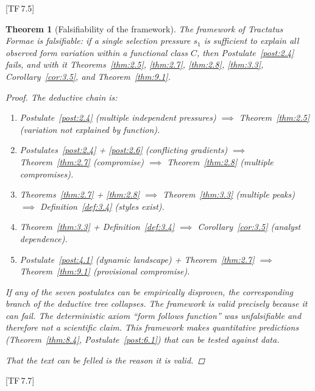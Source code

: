 \documentclass[10pt]{article}
\theoremstyle{definition}
\theoremstyle{plain}
\newtheorem{theorem}[definition]{Theorem}
\theoremstyle{remark}
\newcommand{\TF}[1]{\textnormal{[TF\,#1]}}  %
\begin{document}
\TF{7.5}

\begin{theorem}[Falsifiability of the framework]\label{thm:9.3}
The framework of Tractatus Formae is falsifiable: if a single selection
pressure $s_1$ is sufficient to explain all observed form variation
within a functional class $C$, then Postulate~\ref{post:2.4} fails, and
with it Theorems~\ref{thm:2.5}, \ref{thm:2.7}, \ref{thm:2.8},
\ref{thm:3.3}, Corollary~\ref{cor:3.5}, and Theorem~\ref{thm:9.1}.

\begin{proof}
The deductive chain is:
\begin{enumerate}[nosep]
  \item Postulate~\ref{post:2.4} (multiple independent pressures)
    $\implies$ Theorem~\ref{thm:2.5} (variation not explained by
    function).
  \item Postulates~\ref{post:2.4} + \ref{post:2.6} (conflicting
    gradients) $\implies$ Theorem~\ref{thm:2.7} (compromise) $\implies$
    Theorem~\ref{thm:2.8} (multiple compromises).
  \item Theorems~\ref{thm:2.7} + \ref{thm:2.8} $\implies$
    Theorem~\ref{thm:3.3} (multiple peaks) $\implies$
    Definition~\ref{def:3.4} (styles exist).
  \item Theorem~\ref{thm:3.3} + Definition~\ref{def:3.4} $\implies$
    Corollary~\ref{cor:3.5} (analyst dependence).
  \item Postulate~\ref{post:4.1} (dynamic landscape) +
    Theorem~\ref{thm:2.7}
    $\implies$ Theorem~\ref{thm:9.1} (provisional compromise).
\end{enumerate}

If any of the seven postulates can be empirically disproven, the
corresponding branch of the deductive tree collapses. The framework
is valid precisely because it can fail. The deterministic axiom
``form follows function'' was unfalsifiable and therefore
not a scientific claim. This framework makes quantitative predictions
(Theorem~\ref{thm:8.4}, Postulate~\ref{post:6.1}) that can be tested
against data.

That the text \emph{can} be felled is the reason it is valid.
\qedhere
\end{proof}
\end{theorem}

\TF{7.7}


\newpage
\end{document}
